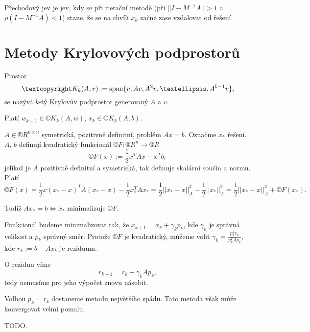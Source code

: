 \documentclass[12pt]{article}					%
\begin{document}
\begin{definice}
	Přechodový jev je jev, kdy se při iterační metodě (při $||I - M^{-1}A|| > 1$ a $\rho(I - M^{-1}A) < 1$) stane, že se na chvíli $x_k$ začne zase vzdalovat od řešení.
\end{definice}

\section{Metody Krylovových podprostorů}
\begin{definice}
	Prostor
	$$ ©K_k(A, v) := \spn\{v, Av, A^2v, …, A^{k-1}v\}, $$
	se nazývá $k$-tý Krylovův podprostor generovaný $A$ a $v$.

	Platí $w_{k-1} \in ©K_k(A, w)$, $x_k \in ©K_k(A, b)$.
\end{definice}

\begin{definice}
	$A \in ®R^{n \times n}$ symetrická, pozitivně definitní, problém $Ax = b$. Označme $x_*$ řešení. $A$, $b$ definují kvadratický funkcionál $©F: ®R^n \rightarrow ®R$
	$$ ©F(x) := \frac{1}{2}x^T A x - x^T b, $$
	jelikož je $A$ pozitivně definitní a symetrická, tak definuje skalární součin a normu. Platí
	$$ ©F(x) = \frac{1}{2}x(x_* - x)^T A(x_* - x) - \frac{1}{2}x_*^T Ax_* = \frac{1}{2} ||x_* - x||_A^2 - \frac{1}{2}||x_*||_A^2 = \frac{1}{2}||x_* - x||_A^2 + ©F(x_*). $$

	Tudíž $Ax_* = b \Leftrightarrow x_*$ minimalizuje $©F$.


	Funkcionál budeme minimalizovat tak, že $x_{k+1} = x_k + \gamma_k p_k$, kde $\gamma_k$ je správná velikost a $p_k$ správný směr. Protože $©F$ je kvadratický, můžeme volit $\gamma_k = \frac{p_k^Tr_k}{p_k^T A p_k}$, kde $r_k := b - Ax_k$ je reziduum.

	O reziduu víme
	$$ r_{k+1} = r_k - \gamma_k A p_k, $$
	tedy nemusíme pro jeho výpočet znovu násobit.

	Volbou $p_k = r_k$ dostaneme metodu největšího spádu. Tato metoda však může konvergovat velmi pomalu.
\end{definice}

\begin{definice}
	TODO.
\end{definice}
\end{document}
